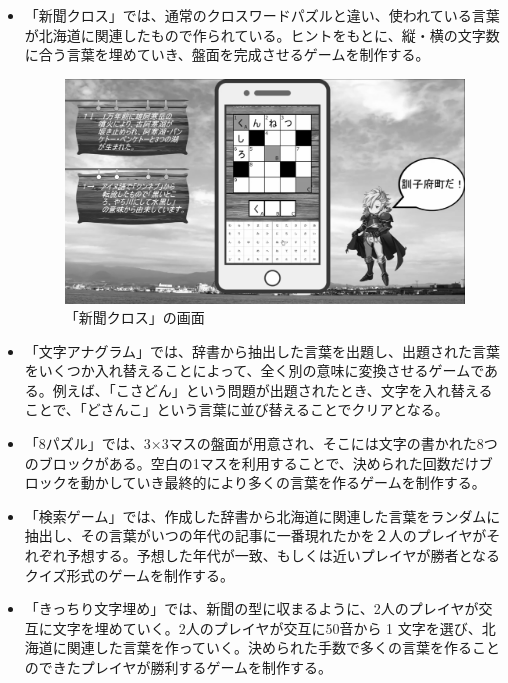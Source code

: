 \begin{itemize}
    \item 「新聞クロス」では、通常のクロスワードパズルと違い、使われている言葉が北海道に関連したもので作られている。ヒントをもとに、縦・横の文字数に合う言葉を埋めていき、盤面を完成させるゲームを制作する。
\begin{figure}[htbp]
    \centering
    \includegraphics[keepaspectratio, scale=0.2]{images/Project_picuture3.png}
    \caption{「新聞クロス」の画面}
    \label{fig:my_label}
\end{figure}
    \item 「文字アナグラム」では、辞書から抽出した言葉を出題し、出題された言葉をいくつか入れ替えることによって、全く別の意味に変換させるゲームである。例えば、「こさどん」という問題が出題されたとき、文字を入れ替えることで、「どさんこ」という言葉に並び替えることでクリアとなる。\\
    
    \item 「8パズル」では、3×3マスの盤面が用意され、そこには文字の書かれた8つのブロックがある。空白の1マスを利用することで、決められた回数だけブロックを動かしていき最終的により多くの言葉を作るゲームを制作する。\\
    
    \item 「検索ゲーム」では、作成した辞書から北海道に関連した言葉をランダムに抽出し、その言葉がいつの年代の記事に一番現れたかを２人のプレイヤがそれぞれ予想する。予想した年代が一致、もしくは近いプレイヤが勝者となるクイズ形式のゲームを制作する。\\
    
    \item 「きっちり文字埋め」では、新聞の型に収まるように、2人のプレイヤが交互に文字を埋めていく。2人のプレイヤが交互に50音から 1 文字を選び、北海道に関連した言葉を作っていく。決められた手数で多くの言葉を作ることのできたプレイヤが勝利するゲームを制作する。\\
    

\end{itemize}
